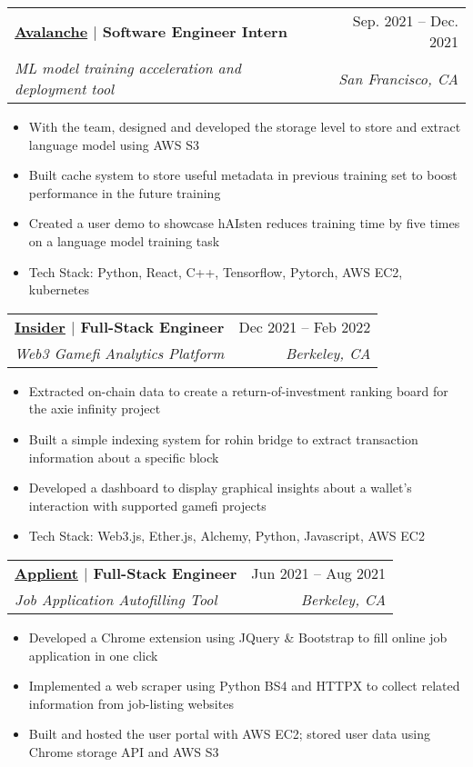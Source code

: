 \documentclass[letterpaper,11pt]{article}
\makeatletter
\newcommand{\resumeItem}[1]{
  \item\small{
    {#1 \vspace{-2pt}}
  }
}
\newcommand{\resumeSubheading}[4]{
  \vspace{-2pt}\item
    \begin{tabular*}{0.97\textwidth}[t]{l@{\extracolsep{\fill}}r}
      \textbf{#1} & #2 \\
      \textit{\small#3} & \textit{\small #4} \\
    \end{tabular*}\vspace{-7pt}
}
\newcommand{\resumeSubSubheading}[2]{
    \item
    \begin{tabular*}{0.97\textwidth}{l@{\extracolsep{\fill}}r}
      \textit{\small#1} & \textit{\small #2} \\
    \end{tabular*}\vspace{-7pt}
}
\newcommand{\resumeSubHeadingListEnd}{\end{itemize}}
\newcommand{\resumeItemListStart}{\begin{itemize}}
\newcommand{\resumeItemListEnd}{\end{itemize}\vspace{-5pt}}
\makeatother
\begin{document}

    \resumeSubheading
    {\href{https://www.avalanc.com/}{\underline{Avalanche}} $|$ \small{Software Engineer Intern}}{Sep. 2021 -- Dec. 2021}
      {ML model training acceleration and deployment tool}{San Francisco, CA}
      \resumeItemListStart
        \resumeItem{With the team, designed and developed the storage level to store and extract language model using AWS S3}
        \resumeItem{Built cache system to store useful metadata in previous training set to boost performance in the future training}
        \resumeItem{Created a user demo to showcase hAIsten reduces training time by five times on a language model training task}
        \resumeItem{Tech Stack: Python, React, C++, Tensorflow, Pytorch, AWS EC2, kubernetes}
    \resumeItemListEnd

    \resumeSubheading
    {\href{https://youtu.be/wMmpyEkLWdU}{\underline{Insider}} $|$ \small{Full-Stack Engineer}}{Dec 2021 -- Feb 2022}
      {Web3 Gamefi Analytics Platform}{Berkeley, CA}
      \resumeItemListStart
        \resumeItem{Extracted on-chain data to create a return-of-investment ranking board for the axie infinity project}
        \resumeItem{Built a simple indexing system for rohin bridge to extract transaction information about a specific block}
        \resumeItem{Developed a dashboard to display graphical insights about a wallet’s interaction with supported gamefi projects}
        \resumeItem{Tech Stack: Web3.js, Ether.js, Alchemy, Python, Javascript, AWS EC2}
      \resumeItemListEnd

      \resumeSubheading
      {\href{https://www.youtube.com/watch?v=CJtjjkdpU5M}{\underline{Applient}} $|$ \small{Full-Stack Engineer}}{Jun 2021 -- Aug 2021}
      {Job Application Autofilling Tool}{Berkeley, CA}
      \resumeItemListStart
        \resumeItem{Developed a Chrome extension using JQuery \& Bootstrap to fill online job application in one click}
        \resumeItem{Implemented a web scraper using Python BS4 and HTTPX to collect related information from job-listing websites}
        \resumeItem{Built and hosted the user portal with AWS EC2; stored user data using Chrome storage API and AWS S3}
      \resumeItemListEnd
\end{document}
